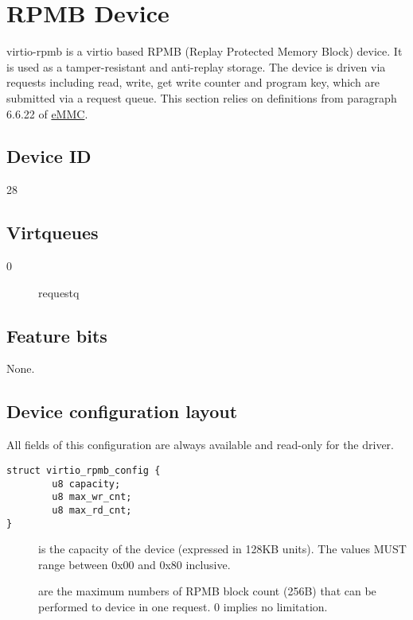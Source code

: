 \section{RPMB Device}\label{sec:Device Types / RPMB Device}

virtio-rpmb is a virtio based RPMB (Replay Protected Memory Block)
device. It is used as a tamper-resistant and anti-replay storage.
The device is driven via requests including read, write, get write
counter and program key, which are submitted via a request queue.
This section relies on definitions from paragraph 6.6.22 of
\hyperref[intro:eMMC]{eMMC}.
\subsection{Device ID}\label{sec:Device Types / RPMB Device / Device ID}

28

\subsection{Virtqueues}\label{sec:Device Types / RPMB Device / Virtqueues}

\begin{description}
\item[0] requestq
\end{description}

\subsection{Feature bits}\label{sec:Device Types / RPMB Device / Feature bits}

None.

\subsection{Device configuration layout}\label{sec:Device Types / RPMB Device / Device configuration layout}

All fields of this configuration are always available and read-only for the driver.

\begin{lstlisting}
struct virtio_rpmb_config {
        u8 capacity;
        u8 max_wr_cnt;
        u8 max_rd_cnt;
}
\end{lstlisting}

\begin{description}
\item[] is the capacity of the device (expressed in 128KB units).
   The values MUST range between 0x00 and 0x80 inclusive.
\item[] are the maximum numbers of RPMB
   block count (256B) that can be performed to device in one request. 0 implies
   no limitation.
\end{description}

